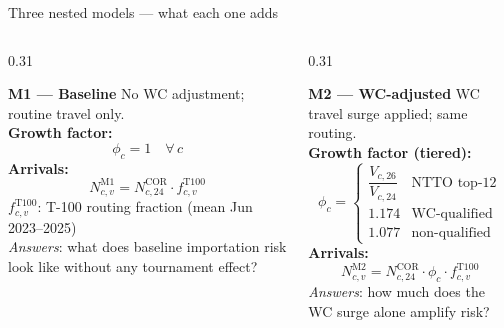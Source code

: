 \documentclass[aspectratio=169, 11pt]{beamer}
\begin{document}
\begin{frame}{Three nested models — what each one adds}
  \begin{columns}[T]

    \begin{column}{0.31\textwidth}
      \begin{block}{\textcolor{baseline}{\textbf{M1 — Baseline}}}
        \scriptsize
        No WC adjustment; routine travel only.\\[4pt]
        \textbf{Growth factor:}
        \[ \phi_c = 1 \quad \forall\, c \]
        \textbf{Arrivals:}
        \[ N_{c,v}^{\text{M1}} = N_{c,24}^{\text{COR}}
           \cdot f_{c,v}^{\text{T100}} \]
        {\tiny $f_{c,v}^{\text{T100}}$: T-100 routing fraction
        (mean Jun 2023--2025)}\\[4pt]
        \textit{Answers}: what does baseline
        importation risk look like without
        any tournament effect?
      \end{block}
    \end{column}

    \begin{column}{0.31\textwidth}
      \begin{block}{\textcolor{wcadj}{\textbf{M2 — WC-adjusted}}}
        \scriptsize
        WC travel surge applied; same routing.\\[4pt]
        \textbf{Growth factor (tiered):}
        \[
          \phi_c = \begin{cases}
            \dfrac{V_{c,26}}{V_{c,24}} & \text{NTTO top-12}\\[4pt]
            1.174 & \text{WC-qualified}\\
            1.077 & \text{non-qualified}
          \end{cases}
        \]
        \textbf{Arrivals:}
        \[ N_{c,v}^{\text{M2}} = N_{c,24}^{\text{COR}}
           \cdot \phi_c \cdot f_{c,v}^{\text{T100}} \]
        \textit{Answers}: how much does the
        WC surge alone amplify risk?
      \end{block}
    \end{column}


\end{columns}
\end{frame}
\end{document}

